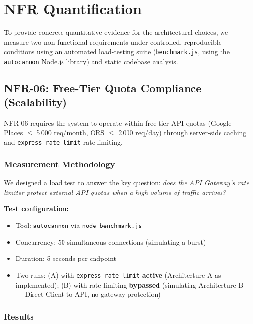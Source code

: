 \documentclass[12pt, a4paper]{article}
\newcommand{\reqid}[1]{\textsc{\small #1}}
\begin{document}
\section{NFR Quantification}

To provide concrete quantitative evidence for the architectural choices, we measure two non-functional requirements under controlled, reproducible conditions using an automated load-testing suite (\texttt{benchmark.js}, using the \texttt{autocannon} Node.js library) and static codebase analysis.

\subsection{NFR-06: Free-Tier Quota Compliance (Scalability)}

\reqid{NFR-06} requires the system to operate within free-tier API quotas (Google Places $\leq$ 5\,000 req/month, ORS $\leq$ 2\,000 req/day) through server-side caching and \texttt{express-rate-limit} rate limiting.

\subsubsection{Measurement Methodology}

We designed a load test to answer the key question: \emph{does the API Gateway's rate limiter protect external API quotas when a high volume of traffic arrives?}

\textbf{Test configuration:}
\begin{itemize}
  \item Tool: \texttt{autocannon} via \texttt{node benchmark.js}
  \item Concurrency: 50 simultaneous connections (simulating a burst)
  \item Duration: 5 seconds per endpoint
  \item Two runs: (A) with \texttt{express-rate-limit} \textbf{active} (Architecture A as implemented); (B) with rate limiting \textbf{bypassed} (simulating Architecture B --- Direct Client-to-API, no gateway protection)
\end{itemize}

\subsubsection{Results}
\end{document}

